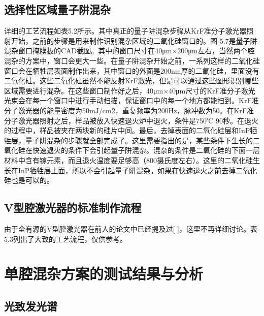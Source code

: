 \documentclass{ZJUthesis}
\begin{document}
\subsection{选择性区域量子阱混杂}

详细的工艺流程如表5.2所示。其中真正的量子阱混杂步骤从KrF准分子激光器照射开始，之前的步骤是用来制作识别混杂区域的二氧化硅窗口的。图 5.7是量子阱混杂窗口掩膜板的CAD截图。其中的窗口尺寸在40μm×200μm左右，当然两个腔混杂的方案中，窗口会更大一些。在量子阱混杂开始之前，一系列这样的二氧化硅窗口会在牺牲层表面制作出来，其中窗口的外面是200nm厚的二氧化硅，里面没有二氧化硅。这些二氧化硅虽然不能反射KrF激光，但是可以通过这些图形识别哪些区域需要进行混杂。在这些窗口制作好之后，40μm×40μm尺寸的KrF准分子激光光束会在每一个窗口中进行手动扫描，保证窗口中的每一个地方都能扫到。KrF准分子激光器的能量密度为50mJ/cm2，重复频率为200Hz，脉冲数为50。在KrF准分子激光器照射之后，样品被放入快速退火炉中退火，条件是750℃ 90秒。在退火的过程中，样品被夹在两块新的硅片中间。最后，去掉表面的二氧化硅层和InP牺牲层，量子阱混杂的步骤就全部完成了。这里需要指出的是，某些条件下生长的二氧化硅在快速退火的条件下会引起量子阱混杂。混杂的条件是二氧化硅的下面一层材料中含有镓元素，而且退火温度要足够高（800摄氏度左右）。这里的二氧化硅生长在InP牺牲层上面，所以不会引起量子阱混杂。如果在快速退火之前去掉二氧化硅也是可以的。

\subsection{V型腔激光器的标准制作流程}

由于全有源的V型腔激光器在前人的论文中已经提及过[ ]，这里不再详细讨论。表5.3列出了大致的工艺流程，仅供参考。

\section{单腔混杂方案的测试结果与分析}

\subsection{光致发光谱}
\end{document}
